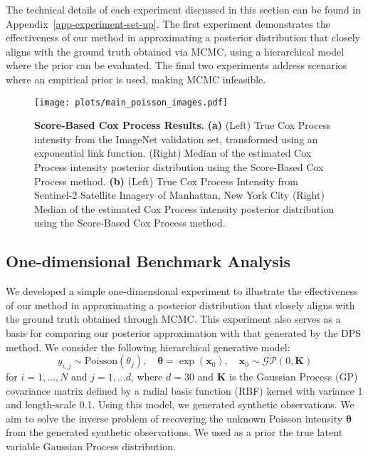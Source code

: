 The technical details of each experiment discussed in this section can be found in Appendix~\ref{app-experiment-set-up}. The first experiment demonstrates the effectiveness of our method in approximating a posterior distribution that closely aligns with the ground truth obtained via MCMC, using a hierarchical model where the prior can be evaluated. The final two experiments address scenarios where an empirical prior is used, making MCMC infeasible.

\begin{figure*}[t!]
\centering
\texttt{[image: plots/main\_poisson\_images.pdf]}
\caption{\textbf{Score-Based Cox Process Results.} \textbf{(a)} (Left) True Cox Process intensity from the ImageNet validation set, transformed using an exponential link function. (Right) Median of the estimated Cox Process intensity posterior distribution using the Score-Based Cox Process method. \textbf{(b)} (Left) True Cox Process Intensity from Sentinel-2 Satellite Imagery of Manhattan, New York City (Right) Median of the estimated Cox Process intensity posterior distribution using the Score-Based Cox Process method.}
\label{fig:imagenet-cox-process}
\end{figure*} 

\subsection{One-dimensional Benchmark Analysis}
\label{sec-1d-synthetic-data}
We developed a simple one-dimensional experiment to illustrate the effectiveness of our method in approximating a posterior distribution that closely aligns with the ground truth obtained through MCMC.
This experiment also serves as a basis for comparing our posterior approximation with that generated by the DPS method. 
We consider the following hierarchical generative model:
\begin{equation*}
y_{i,j} \sim \text{Poisson}(\theta_j), \quad \boldsymbol{\theta} = \exp(\mathbf{x}_0), \quad \mathbf{x}_0 \sim \mathcal{GP}(0, \mathbf{K})
\end{equation*}
for $i = 1, \ldots, N$ and $j = 1, \dots d$, where $d = 30$ and $\mathbf{K}$ is the Gaussian Process (GP) covariance matrix defined by a radial basis function (RBF) kernel with variance 1 and length-scale 0.1. 
Using this model, we generated synthetic observations. We aim to solve the inverse problem of recovering the unknown Poisson intensity $\boldsymbol{\theta}$ from the generated synthetic observations. We used as a prior the true latent variable Gaussian Process distribution. 

